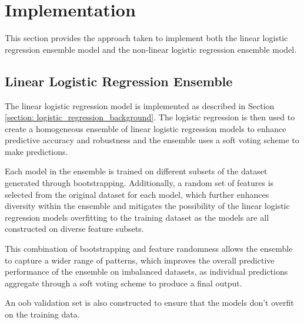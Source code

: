 \documentclass[10pt, conference]{IEEEtran}
\begin{document}
\section{Implementation} \label{section: Implementation}

This section provides the approach taken to implement both the linear logistic regression
ensemble model and the non-linear logistic regression ensemble model.

\subsection{Linear Logistic Regression Ensemble} \label{section: LLRE}

The linear logistic regression model is implemented as described in Section \ref{section: logistic_regression_background}.
The logistic regression is then used to create a homogeneous ensemble of linear logistic regression models to enhance
predictive accuracy and robustness and the ensemble uses a soft voting scheme to make predictions.

Each model in the ensemble is trained on different subsets of the dataset generated
through bootstrapping. Additionally, a random set of features is selected from the
original dataset for each model, which further enhances diversity within the ensemble and mitigates the possibility of the
linear logistic regression models overfitting to the training dataset as the models are all constructed on diverse feature subsets.

This combination of bootstrapping and feature randomness allows the ensemble to capture a wider range of patterns, which
improves the overall predictive performance of the ensemble on imbalanced datasets, as individual predictions aggregate through
a soft voting scheme to produce a final output.

An \acrshort{oob} validation set is also constructed to ensure that the models don't overfit on the training data.
\end{document}

